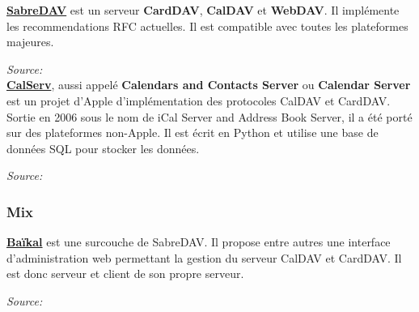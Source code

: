 \underline{\textbf{SabreDAV}} est un serveur \textbf{CardDAV}, \textbf{CalDAV} et \textbf{WebDAV}. Il implémente les recommendations RFC actuelles. Il est compatible avec toutes les plateformes majeures.

\textit{Source: }\\

\underline{\textbf{CalServ}}, aussi appelé \textbf{Calendars and Contacts Server} ou \textbf{Calendar Server} est un projet d'Apple d'implémentation des protocoles CalDAV et CardDAV. Sortie en 2006 sous le nom de iCal Server and Address Book Server, il a été porté sur des plateformes non-Apple. Il est écrit en Python et utilise une base de données SQL pour stocker les données.

\textit{Source: }\\


\subsubsection*{Mix}

\underline{\textbf{Baïkal}} est une surcouche de SabreDAV. Il propose entre autres une interface d'administration web permettant la gestion du serveur CalDAV et CardDAV. Il est donc serveur et client de son propre serveur.

\textit{Source: }